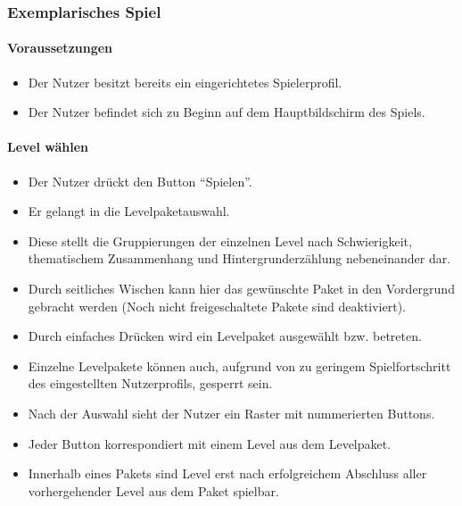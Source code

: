 \subsubsection{Exemplarisches Spiel}
\paragraph{Voraussetzungen}
\begin{itemize}
\item Der Nutzer besitzt bereits ein eingerichtetes Spielerprofil.
\item Der Nutzer befindet sich zu Beginn auf dem Hauptbildschirm des Spiels.
\end{itemize}

\paragraph{Level wählen}
\begin{itemize}
\item Der Nutzer drückt den Button "`Spielen"'.
\item Er gelangt in die Levelpaketauswahl.
\item Diese stellt die Gruppierungen der einzelnen Level nach Schwierigkeit, thematischem Zusammenhang und 
Hintergrunderzählung nebeneinander dar. 
\item Durch seitliches Wischen kann hier das gewünschte Paket in den Vordergrund gebracht werden (Noch nicht freigeschaltete Pakete sind deaktiviert).
\item Durch einfaches Drücken wird ein Levelpaket ausgewählt bzw. betreten.
\item Einzelne Levelpakete können auch, aufgrund von zu geringem Spielfortschritt des 
eingestellten Nutzerprofils, gesperrt sein.
\item Nach der Auswahl sieht der Nutzer ein Raster mit nummerierten Buttons.
\item Jeder Button korrespondiert mit einem Level aus dem Levelpaket.
\item Innerhalb eines Pakets sind Level erst nach erfolgreichem Abschluss aller vorhergehender Level aus dem Paket spielbar.
\end{itemize}

